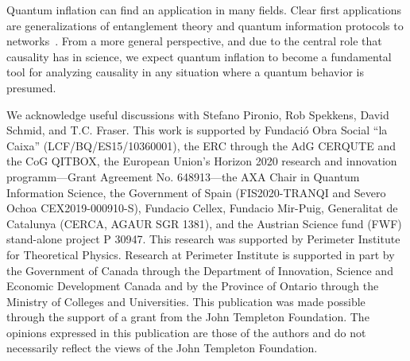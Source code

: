 \documentclass[superscriptaddress,aps,prx,nofootinbib,twocolumn,twoside,reprint,letterpaper,longbibliography]{revtex4-2}
\begin{document}
Quantum inflation can find an application in many fields.
Clear first applications are generalizations of entanglement theory and quantum information protocols to networks~\cite{navascues2020gnme,Schmid2020LOSR}.
From a more general perspective, and due to the central role that causality has in science, we expect quantum inflation to become a fundamental tool for analyzing causality in any situation where a quantum behavior is presumed.

\vspace{-10pt}
\begin{acknowledgments}
We acknowledge useful discussions with Stefano Pironio, Rob Spekkens, David Schmid, and T.C. Fraser. This work is supported by Fundaci\'o Obra Social ``la Caixa'' (LCF/BQ/ES15/10360001), the ERC through the AdG CERQUTE and the CoG QITBOX, the European Union's Horizon 2020 research and innovation programm---Grant Agreement No. 648913---the AXA Chair in Quantum Information Science, the Government of Spain (FIS2020-TRANQI and Severo Ochoa CEX2019-000910-S), Fundacio Cellex, Fundacio Mir-Puig, Generalitat de Catalunya (CERCA, AGAUR SGR 1381), and the Austrian Science fund (FWF) stand-alone project P 30947.
This research was supported by Perimeter Institute for Theoretical Physics. Research at Perimeter Institute is supported in part by the Government of Canada through the Department of Innovation, Science and Economic Development Canada and by the Province of Ontario through the Ministry of Colleges and Universities.
This publication was made possible through the support of a grant from the John Templeton Foundation. The opinions expressed in this publication are those of the authors and do not necessarily reflect the views of the John Templeton Foundation.
\end{acknowledgments}


\nocite{apsrev41Control}
\setlength{\bibsep}{2pt plus 2pt minus 1pt}


\appendix
\end{document}
